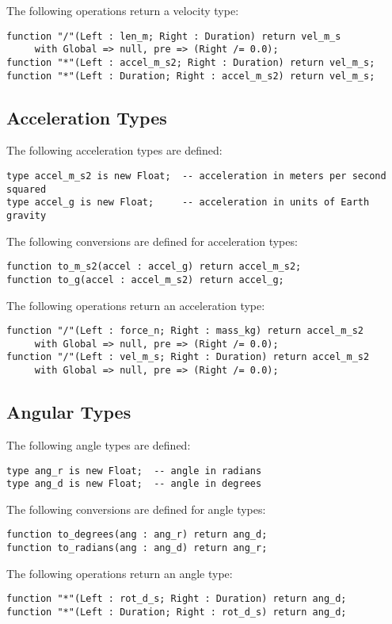 \documentclass[10pt, openany]{book}
\begin{document}
The following operations return a velocity type:
\begin{lstlisting}
function "/"(Left : len_m; Right : Duration) return vel_m_s
     with Global => null, pre => (Right /= 0.0);
function "*"(Left : accel_m_s2; Right : Duration) return vel_m_s;
function "*"(Left : Duration; Right : accel_m_s2) return vel_m_s;
\end{lstlisting}

\subsection{Acceleration Types}
The following acceleration types are defined:
\begin{lstlisting}
type accel_m_s2 is new Float;  -- acceleration in meters per second squared
type accel_g is new Float;     -- acceleration in units of Earth gravity
\end{lstlisting}

The following conversions are defined for acceleration types:
\begin{lstlisting}
function to_m_s2(accel : accel_g) return accel_m_s2;
function to_g(accel : accel_m_s2) return accel_g;
\end{lstlisting}

The following operations return an acceleration type:
\begin{lstlisting}
function "/"(Left : force_n; Right : mass_kg) return accel_m_s2
     with Global => null, pre => (Right /= 0.0);
function "/"(Left : vel_m_s; Right : Duration) return accel_m_s2
     with Global => null, pre => (Right /= 0.0);
\end{lstlisting}

\subsection{Angular Types}
The following angle types are defined:
\begin{lstlisting}
type ang_r is new Float;  -- angle in radians
type ang_d is new Float;  -- angle in degrees
\end{lstlisting}

The following conversions are defined for angle types:
\begin{lstlisting}
function to_degrees(ang : ang_r) return ang_d;
function to_radians(ang : ang_d) return ang_r;
\end{lstlisting}

The following operations return an angle type:
\begin{lstlisting}
function "*"(Left : rot_d_s; Right : Duration) return ang_d;
function "*"(Left : Duration; Right : rot_d_s) return ang_d;
\end{lstlisting}
\end{document}
